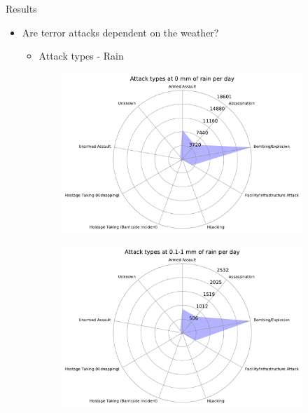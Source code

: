 \documentclass{beamer}
\begin{document}
\begin{frame}{Results}
	\begin{itemize}
		\item 
		Are terror attacks dependent on the weather?
		\begin{itemize}
			\item Attack types - Rain
		\end{itemize}
	\end{itemize}
	
	\begin{figure}
		\begin{subfigure}[b]{0.3\textwidth}
			\includegraphics[width=\textwidth]{Rain-Attack/rain0_starDiagram}
		\end{subfigure}
		\begin{subfigure}[b]{0.3\textwidth}
			\includegraphics[width=\textwidth]{Rain-Attack/rain01-1_starDiagram}
		\end{subfigure}

\end{figure}
\end{frame}
\end{document}
